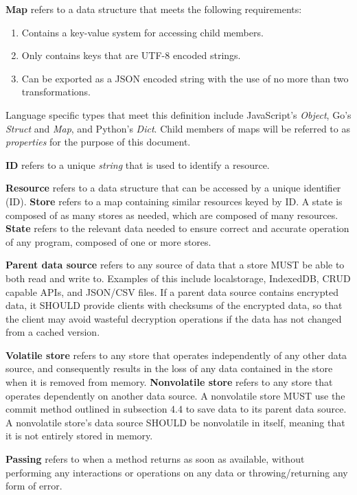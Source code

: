 \documentclass{article}
\begin{document}
\textbf{Map} refers to a data structure that meets the following requirements:
\begin{enumerate}
    \item Contains a key-value system for accessing child members.
    \item Only contains keys that are UTF-8 encoded strings.
    \item Can be exported as a JSON encoded string with the use of no more than two transformations.
\end{enumerate}
Language specific types that meet this definition include JavaScript's \emph{Object}, Go's \emph{Struct} and \emph{Map}, and Python's \emph{Dict}. Child members of maps will be referred to as \emph{properties} for the purpose of this document.

\textbf{ID} refers to a unique \emph{string} that is used to identify a resource.

\textbf{Resource} refers to a data structure that can be accessed by a unique identifier (ID). \textbf{Store} refers to a map containing similar resources keyed by ID. A state is composed of as many stores as needed, which are composed of many resources. \textbf{State} refers to the relevant data needed to ensure correct and accurate operation of any program, composed of one or more stores.

\textbf{Parent data source} refers to any source of data that a store MUST be able to both read and write to. Examples of this include localstorage, IndexedDB, CRUD capable APIs, and JSON/CSV files. If a parent data source contains encrypted data, it SHOULD provide clients with checksums of the encrypted data, so that the client may avoid wasteful decryption operations if the data has not changed from a cached version.

\textbf{Volatile store} refers to any store that operates independently of any other data source, and consequently results in the loss of any data contained in the store when it is removed from memory. \textbf{Nonvolatile store} refers to any store that operates dependently on another data source. A nonvolatile store MUST use the commit method outlined in subsection 4.4 to save data to its parent data source. A nonvolatile store's data source SHOULD be nonvolatile in itself, meaning that it is not entirely stored in memory.

\textbf{Passing} refers to when a method returns as soon as available, without performing any interactions or operations on any data or throwing/returning any form of error.
\end{document}
